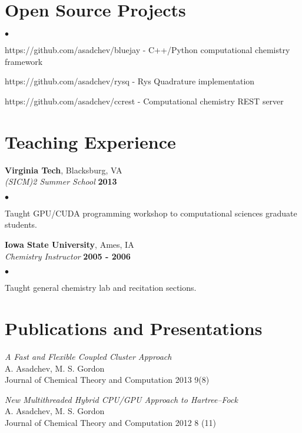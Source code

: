 \documentclass[overlap,line]{cv}
\newenvironment{list2}{
  \begin{list}{$\bullet$}{%
      \setlength{\itemsep}{0in}
      \setlength{\parsep}{0in} \setlength{\parskip}{0in}
      \setlength{\topsep}{0in} \setlength{\partopsep}{0in} 
      \setlength{\leftmargin}{0.2in}}}{\end{list}}
\begin{document}
\begin{resume}
\newpage

\section{\sc Open Source Projects}
\vspace{.1in}
\begin{list2}
  \item https://github.com/asadchev/bluejay - C++/Python computational chemistry framework
  \item https://github.com/asadchev/rysq - Rys Quadrature implementation 
  \item https://github.com/asadchev/ccrest - Computational chemistry REST server
\end{list2}

\section{\sc Teaching Experience}
\vspace{.05in}
{\bf Virginia Tech}, Blacksburg, VA \\
{\em (SICM)2 Summer School} \hfill {\bf 2013}

\begin{list2}
\item Taught GPU/CUDA programming workshop to computational sciences graduate students.
\end{list2}

{\bf Iowa State University}, Ames, IA \\
{\em Chemistry Instructor}  \hfill {\bf 2005 - 2006}

\begin{list2}
\item Taught general chemistry lab and recitation sections. 
\end{list2}


\section{\sc Publications and Presentations}
\vspace{.05in}

{\it A Fast and Flexible Coupled Cluster Approach} \\
A. Asadchev, M. S. Gordon \\
Journal of Chemical Theory and Computation 2013 9(8)

{\it New Multithreaded Hybrid CPU/GPU Approach to Hartree–Fock} \\
A. Asadchev, M. S. Gordon \\
Journal of Chemical Theory and Computation 2012 8 (11)


\end{resume}
\end{document}
